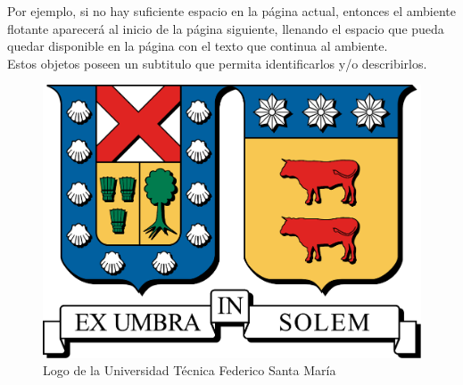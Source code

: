 \documentclass[../notes.tex]{subfiles}
\begin{document}
        Por ejemplo, si no hay suficiente espacio en la página actual, entonces el ambiente flotante aparecerá al inicio de la página siguiente, llenando el espacio que pueda quedar disponible en la página con el texto que continua al ambiente.\\[\baselineskip]
        
        Estos objetos poseen un subtitulo que permita identificarlos y/o describirlos.
        
        \begin{figure}
            \begin{center}
                \includegraphics[scale=0.1]{../utfsm}
        	\end{center}
        	\caption{Logo de la Universidad Técnica Federico Santa María}
        \end{figure}
        
\end{document}
